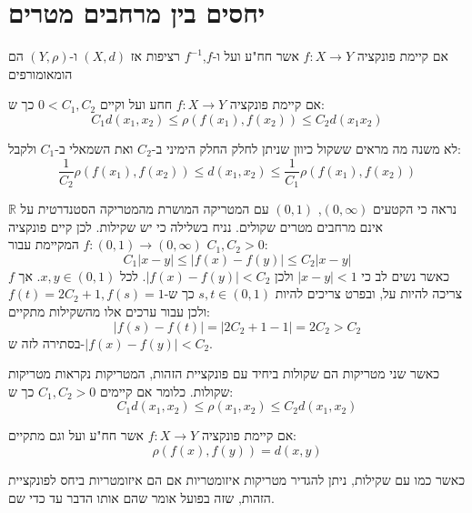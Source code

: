 \documentclass{tstextbook}
\begin{document}
\section{יחסים בין מרחבים מטרים}

\begin{definition}[הומאומורפיזם]
אם קיימת פונקציה \(f:X\to Y\) אשר חח"ע ועל ו-\(f\),\(f^{-1}\) רציפות אז \((X,d)\) ו-\((Y,\rho)\) הם הומאומורפים

\end{definition}
\begin{definition}[שקילות]
אם קיימת פונקציה \(f:X\to Y\) חחע ועל וקיים \(0<C_{1},C_{2}\) כך ש:
$$C_{1}d(x_{1},x_{2})\leq \rho(f(x_{1}),f(x_{2}))\leq C_{2}d(x_{1}x_{2})
$$

\end{definition}
\begin{remark}
לא משנה מה מראים ששקול כיוון שניתן לחלק החלק הימיני ב-\(C_{2}\) ואת השמאלי ב-\(C_{1}\) ולקבל:
$$\frac{1}{C_{2}}\rho(f(x_{1}),f(x_{2}))\leq d(x_{1},x_{2})\leq \frac{1}{C_{1}}\rho(f(x_{1}),f(x_{2}))$$

\end{remark}
\begin{example}
נראה כי הקטעים \(\left( 0,\infty \right)\), \((0,1)\) עם המטריקה המושרת מהמטריקה הסטנדרטית על \(\mathbb{R}\) אינם מרחבים מטרים שקולים. נניח בשלילה כי יש שקילות. לכן קיים פונקציה \(f:(0,1)\to\left( 0,\infty \right)\) המקיימת עבור \(C_{1},C_{2}>0\):
$$C_{1}|x-y|\leq|f(x)-f(y)|\leq C_{2}|x-y|$$
כאשר נשים לב כי \(|x-y|<1\) ולכן \(|f(x)-f(y)|<C_{2}\). לכל \(x,y\in(0,1)\). אך \(f\) צריכה להיות על, ובפרט צריכים להיות \(s,t\in(0,1)\) כך ש-\(f(t)=2C_{2}+1,f(s)=1\) ולכן עבור ערכים אלו מהשקילות מתקיים:
$$|f(s)-f(t)|=|2C_{2}+1-1|=2C_{2}>C_{2}$$
בסתירה לזה ש-\(|f(x)-f(y)|<C_{2}\).

\end{example}
\begin{definition}
כאשר שני מטריקות הם שקולות ביחיד עם פונקציית הזהות, המטריקות נקראות מטריקות שקולות. כלומר אם קיימים \(C_{1},C_{2}>0\) כך ש:
$$C_{1}d(x_{1},x_{2})\leq \rho(x_{1},x_{2})\leq C_{2}d(x_{1},x_{2})$$

\end{definition}
\begin{definition}[איזומטריה]
אם קיימת פונקציה \(f:X\to Y\) אשר חח"ע ועל וגם מתקיים:
$$\rho(f(x),f(y))=d(x,y)$$

\end{definition}
כאשר כמו עם שקילות, ניתן להגדיר מטריקות איזומטריות אם הם איזומטריות ביחס לפונקציית הזהות, שזה בפועל אומר שהם אותו הדבר עד כדי שם.
\end{document}
